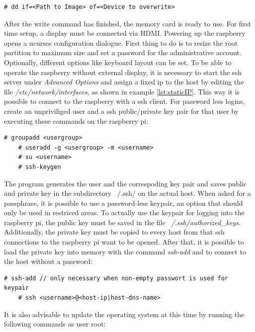\begin{lstlisting}[style=BashInputStyle]
    # dd if=<Path to Image> of=<Device to overwrite>
\end{lstlisting}

After the write command has finished, the memory card is ready to use. For first time setup, a display must be connected via HDMI. Powering up the raspberry
opens a ncurses configuration dialogue. First thing to do is to resize the root partition to maximum size and set a password for the administrative
account. Optionally, different options like keyboard layout can be set.
To be able to operate the raspberry without external display, it is necessary to start the \gls{ssh} server under \textit{Advanced Options} and assign a 
fixed ip to the host by editing the file \textit{/etc/network/interfaces}, as shown in example \ref{lst:staticIP}. This way it is possible to connect to the
raspberry with a \gls{ssh} client. For password less logins, create an unpriviliged user and
 a \gls{ssh} public/private key pair for that user by executing these commands on the raspberry pi:

\begin{lstlisting}[style=BashInputStyle]
    # groupadd <usergroup>
    # useradd -g <usergroup> -m <username>
    # su <username>
    # ssh-keygen
\end{lstlisting}
 
The program generates the user and the correspoding key pair and saves public and private key in the subdirectory ~/.ssh/ on the actual host. When asked for a passphrase, it is possible
to use a password-less keypair, an option that should only be used in restriced areas.
To actually use the keypair for logging into
the raspberry pi, the public key must be saved in the file \textit{~/.ssh/authorized\_keys}. Additionally, the private key must be copied to every host
from that \gls{ssh} connections to the raspberry pi want to be opened. After that, it is possible to load the private key into memory with the command \textit{ssh-add}
and to connect to the host without a password:

\begin{lstlisting}[style=BashInputStyle]
    # ssh-add // only necessary when non-empty passwort is used for keypair
    # ssh <username>@<host-ip|host-dns-name>
\end{lstlisting}

It is also advisable to update the operating system at this time by running the following commands as user root:

